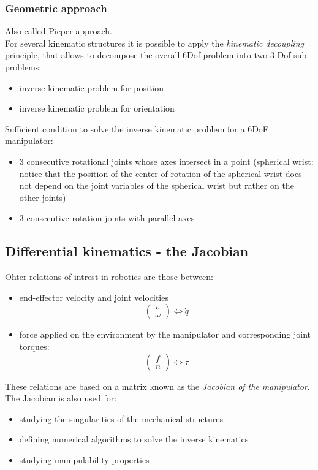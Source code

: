 \documentclass{book}
\begin{document}
\subsubsection{Geometric approach}
Also called Pieper approach.\\
For several kinematic structures it is possible to apply the \emph{kinematic decoupling} principle, that allows to decompose the overall 6Dof problem into two 3 Dof sub-problems:
\begin{itemize}
    \item inverse kinematic problem for position
    \item inverse kinematic problem for orientation 
\end{itemize}
Sufficient condition to solve the inverse kinematic problem for a 6DoF manipulator:
\begin{itemize}
    \item 3 consecutive rotational joints whose axes intersect in a point (spherical wrist: notice that the position of the center of rotation of the spherical wrist does not depend on the joint variables of the spherical wrist but rather on the other joints)
    \item 3 consecutive rotation joints with parallel axes
\end{itemize}





\subsection{Differential kinematics - the Jacobian}
Ohter relations of intrest in robotics are those between:
\begin{itemize}
    \item end-effector velocity and joint velocities $$\begin{pmatrix} v \\ \omega \end{pmatrix} \iff \dot{q}$$
    \item force applied on the environment by the manipulator and corresponding joint torques:
    $$ \begin{pmatrix} f \\ n \end{pmatrix} \iff \tau $$
\end{itemize}
These relations are based on a matrix known as the \emph{Jacobian of the manipulator}. The Jacobian is also used for:
\begin{itemize}
    \item studying the singularities of the mechanical structures
    \item defining numerical algorithms to solve the inverse kinematics
    \item studying manipulability properties
\end{itemize}
\end{document}
